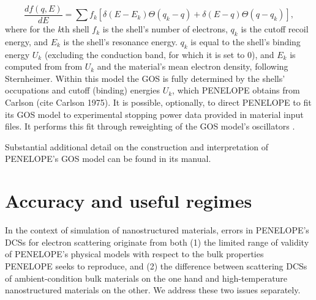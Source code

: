 \documentclass [11pt, proquest, article] {uwthesis}[2016/11/22]
\begin{document}
$$
\frac{df(q, E)}{dE} = \sum f_k [\delta(E - E_k) \Theta (q_k - q) + \delta(E-q) \Theta(q - q_k)],
$$
where for the \emph{k}th shell $f_k$ is the shell's number of electrons, $q_k$ is the cutoff recoil energy, and $E_k$ is the shell's resonance energy. $q_k$ is equal to the shell's binding energy $U_k$ (excluding the conduction band, for which it is set to 0), and $E_k$ is computed from from $U_k$ and the material's mean electron density, following Sternheimer.\cite{sternheimer1953energy} Within this model the GOS is fully determined by the shells' occupations and cutoff (binding) energies $U_k$, which PENELOPE obtains from Carlson (cite Carlson 1975). It is possible, optionally, to direct PENELOPE to fit its GOS model to experimental stopping power data provided in material input files. It performs this fit through reweighting of the GOS model's oscillators .

Substantial additional detail on the construction and interpretation of PENELOPE's GOS model can be found in its manual.


\section{Accuracy and useful regimes}
In the context of simulation of nanostructured materials, errors in PENELOPE's DCSs for electron scattering originate from both (1) the limited range of validity of PENELOPE's physical models with respect to the bulk properties PENELOPE seeks to reproduce, and (2) the difference between scattering DCSs of ambient-condition bulk materials on the one hand and high-temperature nanostructured materials on the other. We address these two issues separately.
\end{document}
